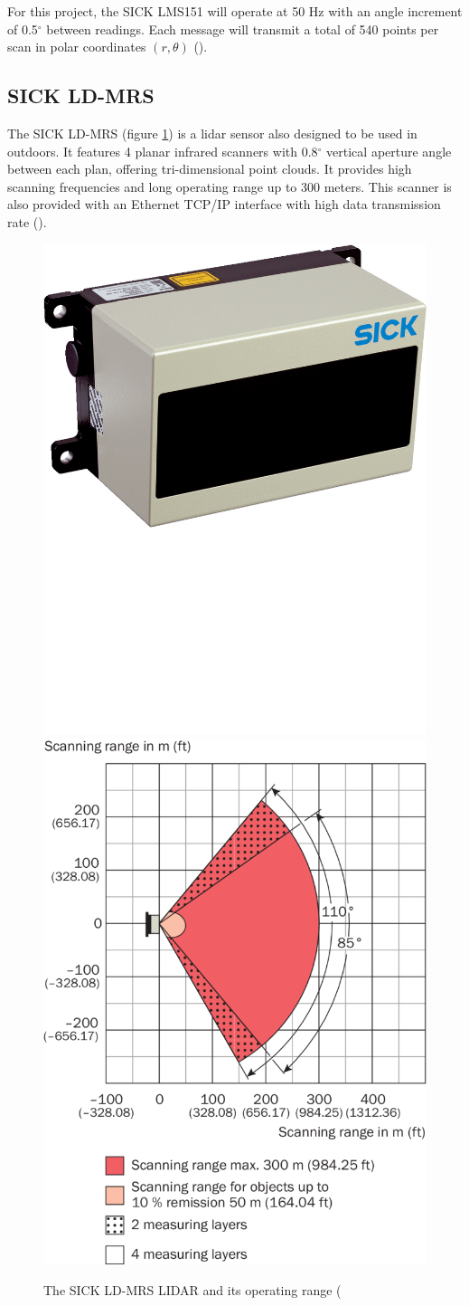 For this project, the SICK LMS151 will operate at 50 Hz with an angle increment of 0.5$^{\circ}$ between readings. Each message will transmit a total of 540 points per scan in polar coordinates $(r,\theta)$ (\cite{SICK}).

\subsection{SICK LD-MRS}

The SICK LD-MRS (figure \ref{fig:sickldmrs}) is a \gls{lidar} sensor also designed to be used in outdoors. It features 4 planar infrared scanners with 0.8$^{\circ}$ vertical aperture angle between each plan, offering tri-dimensional point clouds. It provides high scanning frequencies and long operating range up to 300 meters. This scanner is also provided with an Ethernet TCP/IP interface with high data transmission rate (\cite{SICKa}).

\begin{figure}[htp]
	
	\centering
	\hfill
	\includegraphics[width=.4\textwidth]{capexp/imgs/sickldmrs}\hfill
	\includegraphics[width=.5\textwidth]{capexp/imgs/sickldmrs2}\hfill
	
	\caption{The SICK LD-MRS LIDAR and its operating range (\cite{SICKa}}
	\label{fig:sickldmrs}
	
\end{figure}

